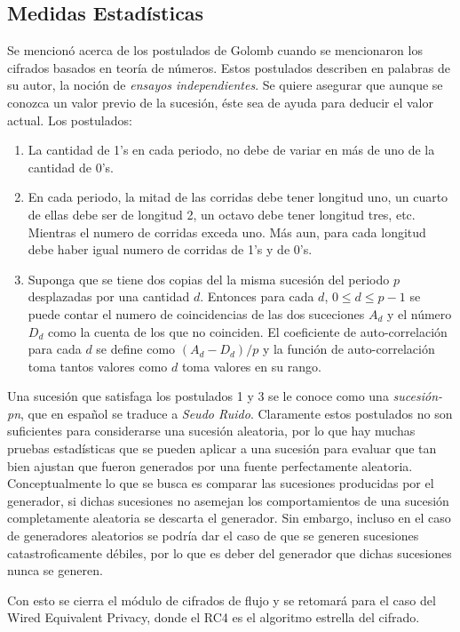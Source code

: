 \subsection{Medidas Estadísticas}
Se mencionó acerca de los postulados de Golomb cuando se mencionaron los cifrados basados en teoría de números. Estos postulados describen en palabras de su autor, la noción de \emph{ensayos independientes}. Se quiere asegurar que aunque se conozca un valor previo de la sucesión, éste sea de ayuda para deducir el valor actual. 
Los postulados:
\begin{enumerate}
	\item La cantidad de 1's  en cada periodo, no debe de variar en más de uno de la cantidad de 0's.
	\item En cada periodo, la mitad de las corridas debe tener longitud uno,  un cuarto de ellas debe ser de longitud 2,  un octavo debe tener longitud tres, etc. Mientras el numero de corridas exceda uno. Más aun, para cada longitud debe haber igual numero de corridas de 1's y de 0's.
	\item Suponga que se tiene dos copias del la misma sucesión del periodo $p$  desplazadas por una cantidad $d$. Entonces para cada $d$, $0\leq d \leq p-1$  se puede contar el numero de coincidencias de las dos suceciones $A_d$ y el número $D_d$ como la cuenta de los que no coinciden. El coeficiente de auto-correlación para cada $d$ se define como $(A_d - D_d) / p$ y la función de auto-correlación toma tantos valores como $d$ toma valores en su rango.
\end{enumerate}
Una sucesión que satisfaga los postulados 1 y 3 se le conoce como una \emph{sucesión-pn}, que en español se traduce a \emph{Seudo Ruido}. Claramente estos postulados no son suficientes para considerarse una sucesión aleatoria, por lo que hay muchas pruebas estadísticas que se pueden aplicar a una sucesión para evaluar que tan bien ajustan que fueron generados por una fuente perfectamente aleatoria.
Conceptualmente lo que se busca es comparar las sucesiones producidas por el generador, si dichas sucesiones no asemejan los comportamientos de una sucesión completamente aleatoria se descarta el generador. Sin embargo, incluso en el caso de generadores aleatorios se podría dar el caso de que se generen sucesiones catastroficamente débiles, por lo que es deber del generador que dichas sucesiones nunca se generen.

Con esto se cierra el módulo de cifrados de flujo y se retomará para el caso del Wired Equivalent Privacy, donde el RC4 es el algoritmo estrella del cifrado.

